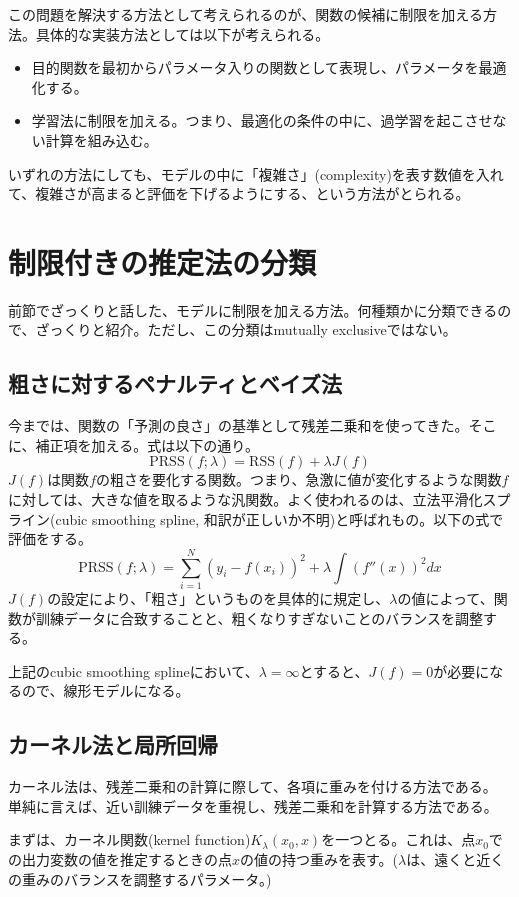 \documentclass{jsarticle}
\begin{document}
この問題を解決する方法として考えられるのが、関数の候補に制限を加える方法。具体的な実装方法としては以下が考えられる。
\begin{itemize}
  \item 目的関数を最初からパラメータ入りの関数として表現し、パラメータを最適化する。
  \item 学習法に制限を加える。つまり、最適化の条件の中に、過学習を起こさせない計算を組み込む。
\end{itemize}
いずれの方法にしても、モデルの中に「複雑さ」(complexity)を表す数値を入れて、複雑さが高まると評価を下げるようにする、という方法がとられる。

\section{制限付きの推定法の分類}
前節でざっくりと話した、モデルに制限を加える方法。何種類かに分類できるので、ざっくりと紹介。ただし、この分類はmutually exclusiveではない。

\subsection{粗さに対するペナルティとベイズ法}
今までは、関数の「予測の良さ」の基準として残差二乗和を使ってきた。そこに、補正項を加える。式は以下の通り。
\[
  \mathrm{PRSS}(f;\lambda)=\mathrm{RSS}(f)+\lambda J(f)
\]
$J(f)$は関数$f$の粗さを要化する関数。つまり、急激に値が変化するような関数$f$に対しては、大きな値を取るような汎関数。よく使われるのは、立法平滑化スプライン(cubic smoothing spline, 和訳が正しいか不明)と呼ばれもの。以下の式で評価をする。
\[
  \mathrm{PRSS}(f;\lambda)=\sum_{i=1}^N(y_i-f(x_i))^2+\lambda\int(f''(x))^2dx
\]
$J(f)$の設定により、「粗さ」というものを具体的に規定し、$\lambda$の値によって、関数が訓練データに合致することと、粗くなりすぎないことのバランスを調整する。

上記のcubic smoothing splineにおいて、$\lambda=\infty$とすると、$J(f)=0$が必要になるので、線形モデルになる。

\subsection{カーネル法と局所回帰}
カーネル法は、残差二乗和の計算に際して、各項に重みを付ける方法である。
単純に言えば、近い訓練データを重視し、残差二乗和を計算する方法である。

まずは、カーネル関数(kernel function)$K_\lambda(x_0,x)$を一つとる。これは、点$x_0$での出力変数の値を推定するときの点$x$の値の持つ重みを表す。($\lambda$は、遠くと近くの重みのバランスを調整するパラメータ。)
\end{document}
